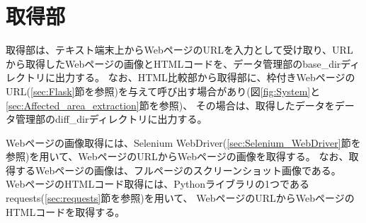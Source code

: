 \section{取得部}\label{sec:Web_data_get_section}
取得部は、テキスト端末上からWebページのURLを入力として受け取り、URLから取得したWebページの画像とHTMLコードを、データ管理部のbase\_dirディレクトリに出力する。
なお、HTML比較部から取得部に、枠付きWebページのURL(\ref{sec:Flask}節を参照)を与えて呼び出す場合があり(図\ref{fig:System}と\ref{sec:Affected_area_extraction}節を参照)、
その場合は、取得したデータをデータ管理部のdiff\_dirディレクトリに出力する。
\par
Webページの画像取得には、Selenium WebDriver(\ref{sec:Selenium_WebDriver}節を参照)を用いて、WebページのURLからWebページの画像を取得する。
なお、取得するWebページの画像は、フルページのスクリーンショット画像である。
WebページのHTMLコード取得には、Pythonライブラリの1つであるrequests(\ref{sec:requests}節を参照)を用いて、
WebページのURLからWebページのHTMLコードを取得する。

